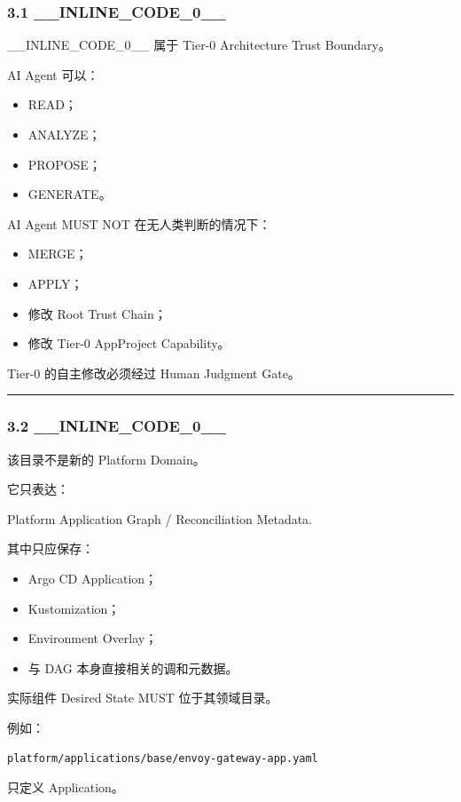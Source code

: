 \documentclass[11pt,a4paper]{article}
\begin{document}
\subsubsection{3.1 \_\_INLINE\_CODE\_0\_\_}
\_\_INLINE\_CODE\_0\_\_ 属于 Tier-0 Architecture Trust Boundary。

AI Agent 可以：

\begin{itemize}
  \item READ；
  \item ANALYZE；
  \item PROPOSE；
  \item GENERATE。
\end{itemize}
AI Agent MUST NOT 在无人类判断的情况下：

\begin{itemize}
  \item MERGE；
  \item APPLY；
  \item 修改 Root Trust Chain；
  \item 修改 Tier-0 AppProject Capability。
\end{itemize}
Tier-0 的自主修改必须经过 Human Judgment Gate。

\vspace{0.5em}\hrule\vspace{0.5em}
\subsubsection{3.2 \_\_INLINE\_CODE\_0\_\_}
该目录不是新的 Platform Domain。

它只表达：

\begin{gfmBlockquote}
Platform Application Graph / Reconciliation Metadata.
\end{gfmBlockquote}
其中只应保存：

\begin{itemize}
  \item Argo CD Application；
  \item Kustomization；
  \item Environment Overlay；
  \item 与 DAG 本身直接相关的调和元数据。
\end{itemize}
实际组件 Desired State MUST 位于其领域目录。

例如：

\begin{lstlisting}[language=text]
platform/applications/base/envoy-gateway-app.yaml
\end{lstlisting}
只定义 Application。
\end{document}
